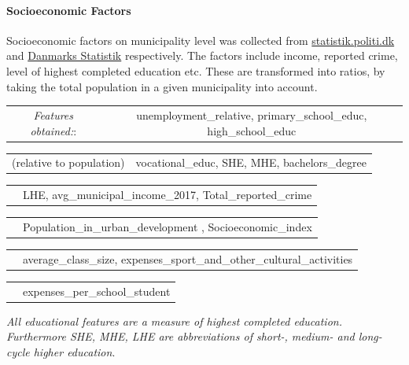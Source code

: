 \documentclass[12pt,a4paper]{article}
\begin{document}
\paragraph{Socioeconomic Factors\newline}
Socioeconomic factors on municipality level was collected from \href{https://statistik.politi.dk/QvAJAXZfc/opendoc.htm?document=QlikApplication%2F2999_Public\%2FPublic_IndsatsResultater.qvw}{statistik.politi.dk} and  
\href{https://www.dst.dk/da/Statistik/emner/befolkning-og-valg}{Danmarks Statistik} respectively. The factors include income, reported crime, level of highest completed education etc. These are transformed into ratios, by taking the total population in a given municipality into account.   
 \vspace*{5px} \newline
\begin{tabular}{c c}
\textit{Features obtained:}: & unemployment\_relative, primary\_school\_educ, high\_school\_educ \\	
\end{tabular}\newline 
\begin{tabular}{c c}
\small (relative to population) & vocational\_educ,	 SHE, 	MHE, bachelors\_degree  \\	
\end{tabular}\newline 
\begin{tabular}{c c}
\qquad \qquad \qquad \qquad \quad & LHE, avg\_municipal\_income\_2017, Total\_reported\_crime\\	
\end{tabular}\newline 
\begin{tabular}{c c}
\qquad \qquad \qquad \qquad \quad & Population\_in\_urban\_development  , Socioeconomic\_index \\	
\end{tabular}\newline 
\begin{tabular}{c c}
\qquad \qquad \qquad \qquad \quad & average\_class\_size,	expenses\_sport\_and\_other\_cultural\_activities	  \\	
\end{tabular}\newline 
\begin{tabular}{c c}
\qquad \qquad \qquad \qquad \quad & expenses\_per\_school\_student	   \\	
\end{tabular}\newline 
\footnotesize{\textit{All educational features are a measure of highest completed education. Furthermore SHE, MHE, LHE are abbreviations of short-, medium- and long-cycle higher education}}. 
\normalsize
\end{document}
